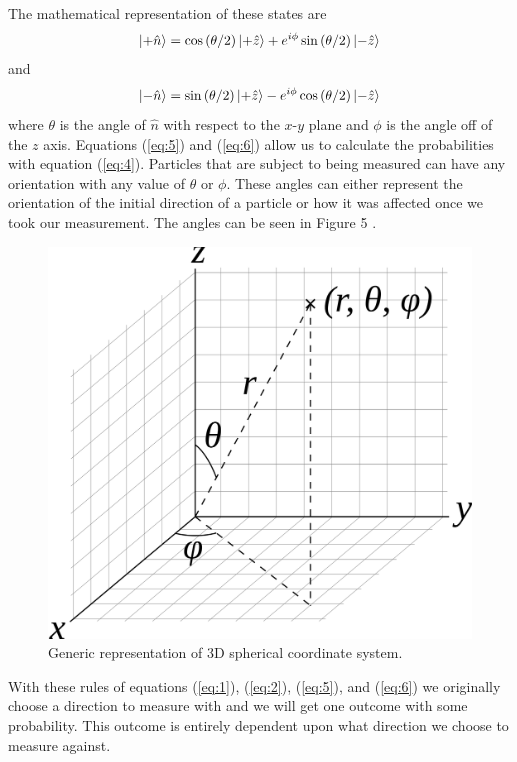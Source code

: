 \documentclass[twocolumn]{article}
\begin{document}
The mathematical representation of these states are 
\begin{equation} \label{eq:5}
\ket{+\hat{n}}=\cos{(\theta/2)}\ket{+\hat{z}}+e^{i\phi}\sin{(\theta/2)}\ket{-\hat{z}}
\end{equation}
and
\begin{equation} \label{eq:6}
\ket{-\hat{n}}=\sin{(\theta/2)}\ket{+\hat{z}}-e^{i\phi}\cos{(\theta/2)}\ket{-\hat{z}}
\end{equation}
where $\theta$ is the angle of $\hat{n}$ with respect to the $x$-$y$ plane and $\phi$ is the angle off of the $z$ axis. Equations (\ref{eq:5}) and (\ref{eq:6}) allow us to calculate the probabilities with equation (\ref{eq:4}). Particles that are subject to being measured can have any orientation with any value of $\theta$ or $\phi$. These angles can either represent the orientation of the initial direction of a particle or how it was affected once we took our measurement. The angles can be seen in Figure 5 \cite{Hazewinkel}.
\begin{figure}[htbp]
\begin{center}
\includegraphics[width=0.75\linewidth]{Spherical-Coordinate-System.png}
\caption{Generic representation of 3D spherical coordinate system.}
\end{center}
\end{figure}
\newline
With these rules of equations (\ref{eq:1}), (\ref{eq:2}), (\ref{eq:5}), and (\ref{eq:6}) we originally choose a direction to measure with and we will get one outcome with some probability. This outcome is entirely dependent upon what direction we choose to measure against.
\end{document}
